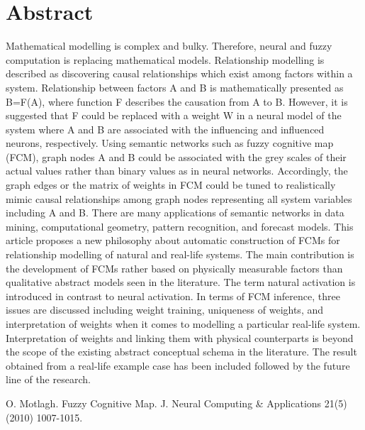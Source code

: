 \documentclass[article, A4, 11pt]{llncs}%
\begin{document}
\section*{Abstract}
Mathematical modelling is complex and bulky. Therefore, neural and fuzzy computation is replacing mathematical models. Relationship modelling is described as discovering causal relationships which exist among factors within a system. Relationship between factors A and B is mathematically presented as B=F(A), where function F describes the causation from A to B. However, it is suggested that F could be replaced with a weight W in a neural model of the system where A and B are associated with the influencing and influenced neurons, respectively. Using semantic networks such as fuzzy cognitive map (FCM), graph nodes A and B could be associated with the grey scales of their actual values rather than binary values as in neural networks. Accordingly, the graph edges or the matrix of weights in FCM could be tuned to realistically mimic causal relationships among graph nodes representing all system variables including A and B. There are many applications of semantic networks in data mining, computational geometry, pattern recognition, and forecast models. This article proposes a new philosophy about automatic construction of FCMs for relationship modelling of natural and real-life systems. The main contribution is the development of FCMs rather based on physically measurable factors than qualitative abstract models seen in the literature. The term natural activation is introduced in contrast to neural activation. In terms of FCM inference, three issues are discussed including weight training, uniqueness of weights, and interpretation of weights when it comes to modelling a particular real-life system. Interpretation of weights and linking them with physical counterparts is beyond the scope of the existing abstract conceptual schema in the literature. The result obtained from a real-life example case has been included followed by the future line of the research.


\begin{thebibliography}{10}
{\sc O. Motlagh}. {Fuzzy Cognitive Map}. J. Neural Computing \& Applications 21(5) (2010) 1007-1015.
\end{thebibliography} %
\end{document}
